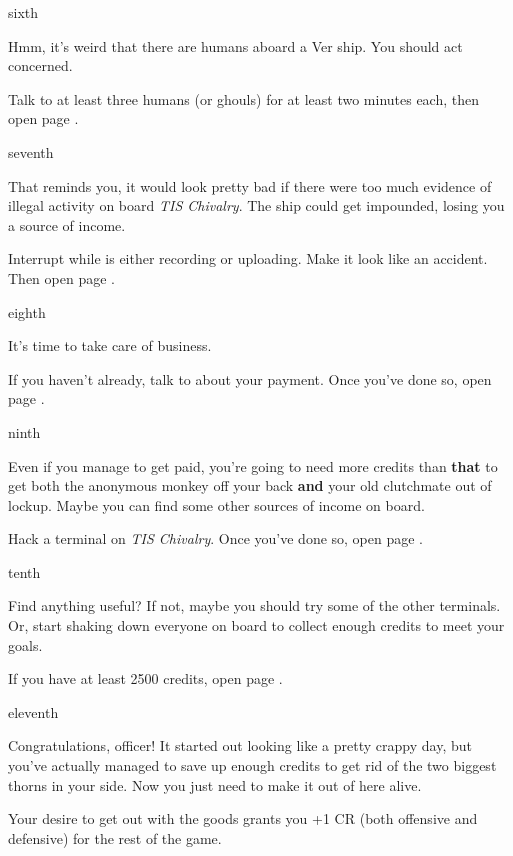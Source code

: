 \documentclass[greennotebook]{guildcamp4} %
\begin{document}
\begin{page}{sixth}

Hmm, it's weird that there are humans aboard a Ver ship. You should act concerned.

Talk to at least three humans (or ghouls) for at least two minutes each, then open page .

\end{page}

\begin{page}{seventh}

That reminds you, it would look pretty bad if there were too much evidence of illegal activity on board \emph{TIS Chivalry}. The ship could get impounded, losing you a source of income.

Interrupt \cCgood{} while  is either recording or uploading. Make it look like an accident. Then open page .

\end{page}

\begin{page}{eighth}

It's time to take care of business.

If you haven't already, talk to \cVone{} about your payment. Once you've done so, open page .

\end{page}

\begin{page}{ninth}

Even if you manage to get paid, you're going to need more credits than {\bf that} to get both the anonymous monkey off your back {\bf and} your old clutchmate out of lockup. Maybe you can find some other sources of income on board.

Hack a terminal on \emph{TIS Chivalry}. Once you've done so, open page .

\end{page}

\begin{page}{tenth}

Find anything useful? If not, maybe you should try some of the other terminals. Or, start shaking down everyone on board to collect enough credits to meet your goals.

If you have at least 2500 credits, open page .

\end{page}

\begin{page}{eleventh}

Congratulations, officer! It started out looking like a pretty crappy day, but you've actually managed to save up enough credits to get rid of the two biggest thorns in your side. Now you just need to make it out of here alive.

Your desire to get out with the goods grants you +1 CR (both offensive and defensive) for the rest of the game.

\end{page}

\endnotebook
\end{document}
